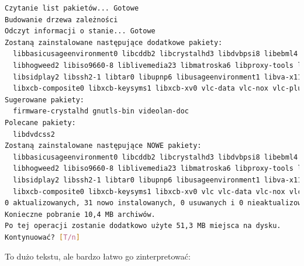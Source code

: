 \begin{lstlisting}[language=bash]
Czytanie list pakietów... Gotowe
Budowanie drzewa zależności       
Odczyt informacji o stanie... Gotowe
Zostaną zainstalowane następujące dodatkowe pakiety:
  libbasicusageenvironment0 libcddb2 libcrystalhd3 libdvbpsi8 libebml4 libgnutls28 libgroupsock1
  libhogweed2 libiso9660-8 liblivemedia23 libmatroska6 libproxy-tools libresid-builder0c2a libsdl-image1.2
  libsidplay2 libssh2-1 libtar0 libupnp6 libusageenvironment1 libva-x11-1 libvcdinfo0 libvlc5 libvlccore7
  libxcb-composite0 libxcb-keysyms1 libxcb-xv0 vlc-data vlc-nox vlc-plugin-notify vlc-plugin-pulse
Sugerowane pakiety:
  firmware-crystalhd gnutls-bin videolan-doc
Polecane pakiety:
  libdvdcss2
Zostaną zainstalowane następujące NOWE pakiety:
  libbasicusageenvironment0 libcddb2 libcrystalhd3 libdvbpsi8 libebml4 libgnutls28 libgroupsock1
  libhogweed2 libiso9660-8 liblivemedia23 libmatroska6 libproxy-tools libresid-builder0c2a libsdl-image1.2
  libsidplay2 libssh2-1 libtar0 libupnp6 libusageenvironment1 libva-x11-1 libvcdinfo0 libvlc5 libvlccore7
  libxcb-composite0 libxcb-keysyms1 libxcb-xv0 vlc vlc-data vlc-nox vlc-plugin-notify vlc-plugin-pulse
0 aktualizowanych, 31 nowo instalowanych, 0 usuwanych i 0 nieaktualizowanych.
Konieczne pobranie 10,4 MB archiwów.
Po tej operacji zostanie dodatkowo użyte 51,3 MB miejsca na dysku.
Kontynuować? [T/n] 
\end{lstlisting}

To dużo tekstu, ale bardzo łatwo go zinterpretować:

